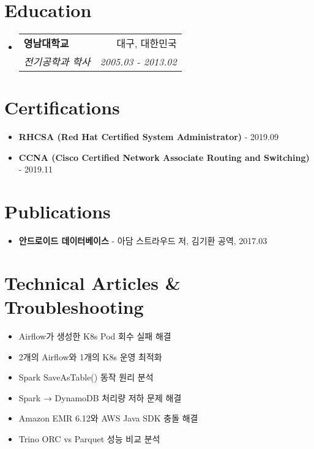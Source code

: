 \documentclass[letterpaper,11pt]{article}
\makeatletter
\newcommand{\resumeItem}[1]{
  \item\small{
    {#1 \vspace{-2pt}}
  }
}
\newcommand{\resumeSubheading}[4]{
  \vspace{-1pt}\item
    \begin{tabular*}{0.97\textwidth}[t]{l@{\extracolsep{\fill}}r}
      \textbf{#1} & #2 \\
      \textit{\small#3} & \textit{\small #4} \\
    \end{tabular*}\vspace{-5pt}
}
\newcommand{\resumeSubHeadingListStart}{\begin{itemize}[leftmargin=*]}
\newcommand{\resumeSubHeadingListEnd}{\end{itemize}}
\makeatother
\begin{document}
\section{Education}
  \resumeSubHeadingListStart
    \resumeSubheading
      {영남대학교}{대구, 대한민국}
      {전기공학과 학사}{2005.03 - 2013.02}

  \resumeSubHeadingListEnd

\section{Certifications}
    \resumeSubHeadingListStart
        \resumeItem{\textbf{RHCSA (Red Hat Certified System Administrator)} - 2019.09}
        \resumeItem{\textbf{CCNA (Cisco Certified Network Associate Routing and Switching)} - 2019.11}
    \resumeSubHeadingListEnd

\section{Publications}
    \resumeSubHeadingListStart
        \resumeItem{\textbf{안드로이드 데이터베이스} - 아담 스트라우드 저, 김기환 공역, 2017.03}
    \resumeSubHeadingListEnd

\section{Technical Articles \& Troubleshooting}
    \resumeSubHeadingListStart
        \resumeItem{Airflow가 생성한 K8s Pod 회수 실패 해결}
        \resumeItem{2개의 Airflow와 1개의 K8s 운영 최적화}
        \resumeItem{Spark SaveAsTable() 동작 원리 분석}
        \resumeItem{Spark → DynamoDB 처리량 저하 문제 해결}
        \resumeItem{Amazon EMR 6.12와 AWS Java SDK 충돌 해결}
        \resumeItem{Trino ORC vs Parquet 성능 비교 분석}
    \resumeSubHeadingListEnd

\end{document}
